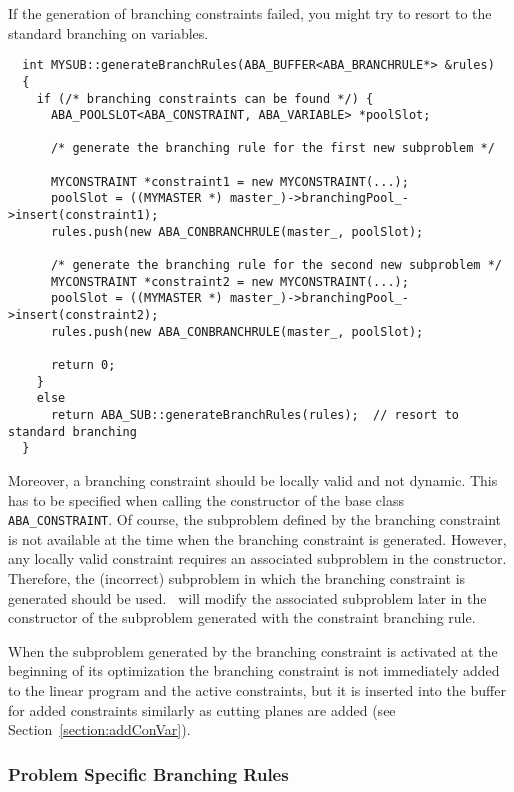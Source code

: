 If the generation of branching
constraints failed, you might try to resort to the standard branching on
variables.
\begin{verbatim}
  int MYSUB::generateBranchRules(ABA_BUFFER<ABA_BRANCHRULE*> &rules)
  {
    if (/* branching constraints can be found */) {
      ABA_POOLSLOT<ABA_CONSTRAINT, ABA_VARIABLE> *poolSlot;

      /* generate the branching rule for the first new subproblem */

      MYCONSTRAINT *constraint1 = new MYCONSTRAINT(...);
      poolSlot = ((MYMASTER *) master_)->branchingPool_->insert(constraint1);
      rules.push(new ABA_CONBRANCHRULE(master_, poolSlot);

      /* generate the branching rule for the second new subproblem */
      MYCONSTRAINT *constraint2 = new MYCONSTRAINT(...);
      poolSlot = ((MYMASTER *) master_)->branchingPool_->insert(constraint2);
      rules.push(new ABA_CONBRANCHRULE(master_, poolSlot);

      return 0;
    }
    else
      return ABA_SUB::generateBranchRules(rules);  // resort to standard branching
  }
\end{verbatim}
Moreover, a branching constraint should be locally valid and not
dynamic. This has to be specified when calling the constructor
of the base class {\tt ABA\_CONSTRAINT}. Of course, the subproblem defined by
the branching constraint is not available at the time when
the branching constraint is generated. However, any locally valid
constraint requires an associated subproblem in the constructor.
Therefore, the (incorrect) subproblem in which the branching
constraint is generated should be used. \ABACUS\ will modify the
associated subproblem later in the constructor of the subproblem
generated with the constraint branching rule.

When the subproblem generated by the branching constraint is
activated at the beginning of its optimization the branching
constraint is not immediately added to the linear program and the
active constraints, but it is inserted into the buffer for added 
constraints similarly as cutting planes are added
(see Section~\ref{section:addConVar}).

\subsubsection{Problem Specific Branching Rules}
\label{section:problemSpecificBranchingRules}


